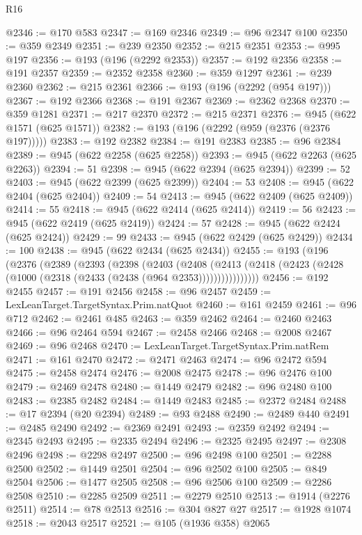 \begin{lexlean}{R16}
\begin{coremodule}
@2346 := @170 @583
@2347 := @169 @2346
@2349 := @96 @2347 @100
@2350 := @359 @2349
@2351 := @239 @2350
@2352 := @215 @2351
@2353 := @995 @197
@2356 := @193 (@196 (@2292 @2353))
@2357 := @192 @2356
@2358 := @191 @2357
@2359 := @2352 @2358
@2360 := @359 @1297
@2361 := @239 @2360
@2362 := @215 @2361
@2366 := @193 (@196 (@2292 (@954 @197)))
@2367 := @192 @2366
@2368 := @191 @2367
@2369 := @2362 @2368
@2370 := @359 @1281
@2371 := @217 @2370
@2372 := @215 @2371
@2376 := @945 (@622 @1571 (@625 @1571))
@2382 := @193 (@196 (@2292 (@959 (@2376 (@2376 @197)))))
@2383 := @192 @2382
@2384 := @191 @2383
@2385 := @96 @2384
@2389 := @945 (@622 @2258 (@625 @2258))
@2393 := @945 (@622 @2263 (@625 @2263))
@2394 := 51
@2398 := @945 (@622 @2394 (@625 @2394))
@2399 := 52
@2403 := @945 (@622 @2399 (@625 @2399))
@2404 := 53
@2408 := @945 (@622 @2404 (@625 @2404))
@2409 := 54
@2413 := @945 (@622 @2409 (@625 @2409))
@2414 := 55
@2418 := @945 (@622 @2414 (@625 @2414))
@2419 := 56
@2423 := @945 (@622 @2419 (@625 @2419))
@2424 := 57
@2428 := @945 (@622 @2424 (@625 @2424))
@2429 := 99
@2433 := @945 (@622 @2429 (@625 @2429))
@2434 := 100
@2438 := @945 (@622 @2434 (@625 @2434))
@2455 := @193
    (@196
      (@2376
        (@2389
          (@2393
            (@2398
              (@2403
                (@2408
                  (@2413
                    (@2418 (@2423 (@2428 (@1000 (@2318 (@2433 (@2438 (@964 @2353))))))))))))))))
@2456 := @192 @2455
@2457 := @191 @2456
@2458 := @96 @2457
@2459 := LexLeanTarget.TargetSyntax.Prim.natQuot
@2460 := @161 @2459
@2461 := @96 @712
@2462 := @2461 @485
@2463 := @359 @2462
@2464 := @2460 @2463
@2466 := @96 @2464 @594
@2467 := @2458 @2466
@2468 := @2008 @2467
@2469 := @96 @2468
@2470 := LexLeanTarget.TargetSyntax.Prim.natRem
@2471 := @161 @2470
@2472 := @2471 @2463
@2474 := @96 @2472 @594
@2475 := @2458 @2474
@2476 := @2008 @2475
@2478 := @96 @2476 @100
@2479 := @2469 @2478
@2480 := @1449 @2479
@2482 := @96 @2480 @100
@2483 := @2385 @2482
@2484 := @1449 @2483
@2485 := @2372 @2484
@2488 := @17 @2394 (@20 @2394)
@2489 := @93 @2488
@2490 := @2489 @440
@2491 := @2485 @2490
@2492 := @2369 @2491
@2493 := @2359 @2492
@2494 := @2345 @2493
@2495 := @2335 @2494
@2496 := @2325 @2495
@2497 := @2308 @2496
@2498 := @2298 @2497
@2500 := @96 @2498 @100
@2501 := @2288 @2500
@2502 := @1449 @2501
@2504 := @96 @2502 @100
@2505 := @849 @2504
@2506 := @1477 @2505
@2508 := @96 @2506 @100
@2509 := @2286 @2508
@2510 := @2285 @2509
@2511 := @2279 @2510
@2513 := @1914 (@2276 @2511)
@2514 := @78 @2513
@2516 := @304 @827 @27
@2517 := @1928 @1074
@2518 := @2043 @2517
@2521 := @105 (@1936 @358) @2065

\end{coremodule}
\end{lexlean}
